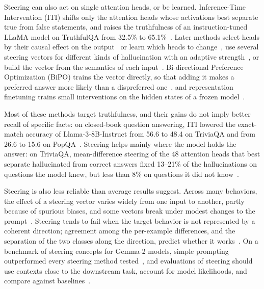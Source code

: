 \documentclass[sigconf,nonacm]{acmart}
\begin{document}
Steering can also act on single attention heads, or be learned. Inference-Time Intervention (ITI) shifts only the attention heads whose activations best separate true from false statements, and raises the truthfulness of an instruction-tuned LLaMA model on TruthfulQA from 32.5\% to 65.1\%~\cite{li2023iti}. Later methods select heads by their causal effect on the output~\cite{todd2024function} or learn which heads to change~\cite{yin2024lofit}, use several steering vectors for different kinds of hallucination with an adaptive strength~\cite{wang2025act}, or build the vector from the semantics of each input~\cite{wang2024sadi}. Bi-directional Preference Optimization (BiPO) trains the vector directly, so that adding it makes a preferred answer more likely than a dispreferred one~\cite{cao2024bipo}, and representation finetuning trains small interventions on the hidden states of a frozen model~\cite{wu2024reft}.

Most of these methods target truthfulness, and their gains do not imply better recall of specific facts: on closed-book question answering, ITI lowered the exact-match accuracy of Llama-3-8B-Instruct from 56.6 to 48.4 on TriviaQA and from 26.6 to 15.6 on PopQA~\cite{gema2025decore}. Steering helps mainly where the model holds the answer: on TriviaQA, mean-difference steering of the 48 attention heads that best separate hallucinated from correct answers fixed 13--21\% of the hallucinations on questions the model knew, but less than 8\% on questions it did not know~\cite{simhi2025hack}.

Steering is also less reliable than average results suggest. Across many behaviors, the effect of a steering vector varies widely from one input to another, partly because of spurious biases, and some vectors break under modest changes to the prompt~\cite{tan2024reliability}. Steering tends to fail when the target behavior is not represented by a coherent direction; agreement among the per-example differences, and the separation of the two classes along the direction, predict whether it works~\cite{braun2025unreliability}. On a benchmark of steering concepts for Gemma-2 models, simple prompting outperformed every steering method tested~\cite{wu2025axbench}, and evaluations of steering should use contexts close to the downstream task, account for model likelihoods, and compare against baselines~\cite{pres2024reliable}.
\end{document}

